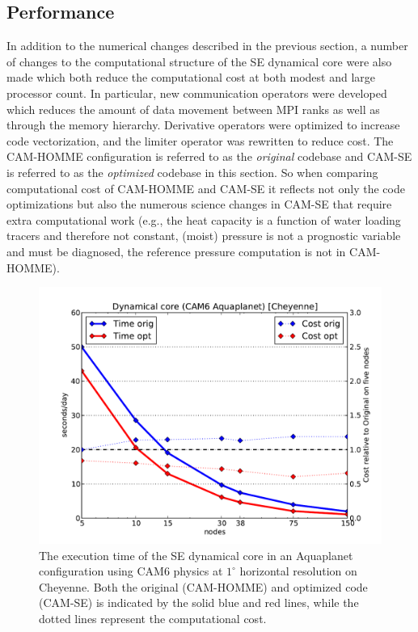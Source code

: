 \documentclass{agujournal}
\begin{document}
\subsection{Performance}\label{sec:performance}
In addition to the numerical changes described in the previous section, a number of changes to the computational structure of the SE dynamical core were also made which both reduce the computational cost at both modest and large processor count.  In particular, new communication operators were developed which reduces the amount of data movement between MPI ranks as well as through the memory hierarchy. Derivative operators were optimized to increase code vectorization, and the limiter operator was rewritten to reduce cost.  The CAM-HOMME configuration is referred to as the {\em{original}} codebase and CAM-SE is referred to as the {\em{optimized}} codebase in this section. So when comparing computational cost of CAM-HOMME and CAM-SE it reflects not only the code optimizations but also the numerous science changes in CAM-SE that require extra computational work (e.g., the heat capacity is a function of water loading tracers and therefore not constant, (moist) pressure is not a prognostic variable and must be diagnosed, the reference pressure computation is not in CAM-HOMME).
\begin{figure}[h]
\centering
 \includegraphics[scale=0.45]{figs/aqua-perf}
 \caption{The execution time of the SE dynamical core in an Aquaplanet configuration using CAM6 physics at $1^\circ$ horizontal resolution on Cheyenne.   Both the original (CAM-HOMME) and optimized code (CAM-SE) is indicated by the solid blue and red lines, while the dotted lines represent the computational cost.}
 \label{fig:aqua-perf}
\end{figure}
\end{document}

